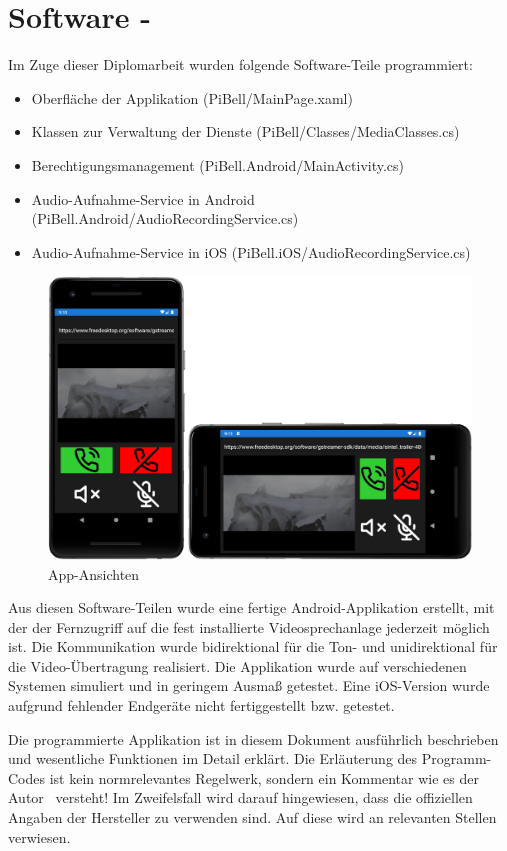\section{Software - \AndreasGrain}
Im Zuge dieser Diplomarbeit wurden folgende Software-Teile programmiert:
\begin{itemize}
    \item Oberfläche der Applikation (PiBell/MainPage.xaml)
    \item Klassen zur Verwaltung der Dienste (PiBell/Classes/MediaClasses.cs)
    \item Berechtigungsmanagement (PiBell.Android/MainActivity.cs)
    \item Audio-Aufnahme-Service in Android (PiBell.Android/AudioRecordingService.cs)
    \item Audio-Aufnahme-Service in iOS (PiBell.iOS/AudioRecordingService.cs)
\end{itemize}

\begin{figure}[H]
    \centering
    \includegraphics[width=.9\linewidth]{images/projektergebnis/ansichtenFinaleApp.png}
    \caption{App-Ansichten}
\end{figure}

Aus diesen Software-Teilen wurde eine fertige Android-Applikation erstellt, mit der der Fernzugriff auf die fest installierte Videosprechanlage jederzeit möglich ist.
Die Kommunikation wurde bidirektional für die Ton- und unidirektional für die Video-Übertragung realisiert.
Die Applikation wurde auf verschiedenen Systemen simuliert und in geringem Ausmaß getestet.
Eine iOS-Version wurde aufgrund fehlender Endgeräte nicht fertiggestellt bzw. getestet.\par

Die programmierte Applikation ist in diesem Dokument ausführlich beschrieben und wesentliche Funktionen im Detail erklärt.
Die Erläuterung des Programm-Codes ist kein normrelevantes Regelwerk, sondern ein Kommentar wie es der Autor \AndreasGrain\ versteht!
Im Zweifelsfall wird darauf hingewiesen, dass die offiziellen Angaben der Hersteller zu verwenden sind.
Auf diese wird an relevanten Stellen verwiesen.

